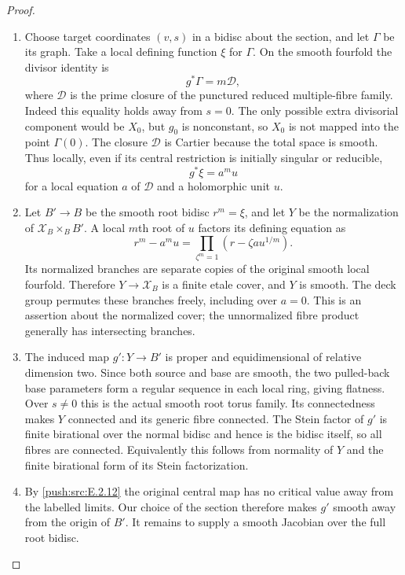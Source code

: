 \begin{proof}

\begin{enumerate}[label={$\langle1\rangle$\arabic*.},leftmargin=*]
\item Choose target coordinates $(v,s)$ in a bidisc about
the section, and let $\Gamma$ be its graph.  Take a
local defining function $\xi$ for $\Gamma$.
On the smooth fourfold the divisor identity is
\[
 g^*\Gamma=m\mathcal D,
\]
where $\mathcal D$ is the prime closure of the
punctured reduced multiple-fibre family.  Indeed
this equality holds away from $s=0$.  The only
possible extra divisorial component would be
$X_0$, but $g_0$ is nonconstant, so $X_0$ is not
mapped into the point $\Gamma(0)$.  The closure
$\mathcal D$ is Cartier because the total space
is smooth.  Thus locally, even if its central
restriction is initially singular or reducible,
\[
 g^*\xi=a^m u
\]
for a local equation $a$ of $\mathcal D$ and a
holomorphic unit $u$.

\item Let $B'\to B$ be the smooth root bidisc
$r^m=\xi$, and let $Y$ be the normalization
of $\mathcal X_B\times_B B'$.  A local $m$th
root of $u$ factors its defining equation as
\[
 r^m-a^m u=
 \prod_{\zeta^m=1}(r-\zeta a u^{1/m}).
\]
Its normalized branches are separate copies of
the original smooth local fourfold.  Therefore
$Y\to\mathcal X_B$ is a finite etale cover,
and $Y$ is smooth.  The deck group permutes these
branches freely, including over $a=0$.
This is an assertion about the normalized cover;
the unnormalized fibre product generally has
intersecting branches.

\item The induced map $g':Y\to B'$ is proper and
equidimensional of relative dimension two.
Since both source and base are smooth, the
two pulled-back base parameters form a regular
sequence in each local ring, giving flatness.
Over $s\ne0$ this is the actual smooth root
torus family.  Its connectedness makes $Y$
connected and its generic fibre connected.
The Stein factor of $g'$ is finite birational
over the normal bidisc and hence is the
bidisc itself, so all fibres are connected.
Equivalently this follows from normality of
$Y$ and the finite birational form of its
Stein factorization.

\item By \ref{push:src:E.2.12} the original central map has no
critical value away from the labelled limits.
Our choice of the section therefore makes
$g'$ smooth away from the origin of $B'$.
It remains to supply a smooth Jacobian over
the full root bidisc.


\end{enumerate}
\end{proof}
